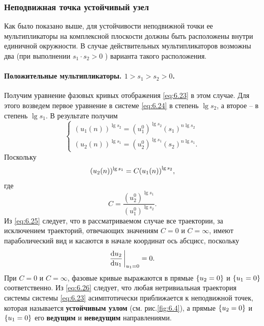 \subsubsection{Неподвижная точка устойчивый узел}%

Как было показано выше, для устойчивости неподвижной точки ее
мультипликаторы на комплексной плоскости должны быть расположены
внутри единичной окружности. В случае действительных мультипликаторов
возможны два (при выполнении $s_1 \cdot s_2>0$ ) варианта такого расположения.

\paragraph{Положительные мультипликаторы. $1>s_1>s_2>0$.}%

Получим уравнение фазовых кривых отображения \eqref{eq:6.23} в этом случае. 
Для этого возведем первое уравнение в системе \eqref{eq:6.24} в степень $\lg s_2$, а второе --
в степень $\lg s_1$. В результате получим
\begin{equation}
        \label{eq:6.25}
        \begin{cases}
                (u_1(n))^{\lg s_2} = (u_1^0)^{\lg s_2} (s_1)^{n \lg s_2} \\
                 (u_2(n))^{\lg s_1} = (u_2^0)^{\lg s_1} (s_2)^{n \lg s_1}.
        \end{cases}
\end{equation}
Поскольку
\begin{equation}
        \label{eq:6.26}
        ( u_2(n))^{\lg s_1} = C\qty( u_1(n) )^{\lg s_2},
\end{equation}
где
\begin{equation}
        \label{eq:}
        C = \frac{( u_2^0)^{\lg s_1}}{(u_1^0)^{\lg s_2}}.
\end{equation}
Из \eqref{eq:6.25} следует, что в рассматриваемом случае все траектории, за исключением траекторий, отвечающих значениям
$C=0$ и $C=\infty$, имеют параболический вид и касаются в начале координат ось абсцисс, поскольку
\begin{equation}
        \label{eq:}
        \dv{u_2}{u_1} \eval_{u_1=0} = 0.
\end{equation}
При $C=0$ и $C=\infty$, фазовые кривые выражаются в прямые 
$\qty{u_2=0}$ и $\qty{u_{1}=0}$ соответственно. Из
\eqref{eq:6.26} следует, что любая нетривиальная траектория системы 
системы  \eqref{eq:6.23} асимптотически приближается к неподвижной  точек, которая называется
\textbf{устойчивым узлом} (см. рис.\ref{fig:6.4}), а прямые $\qty{u_2=0}$ и $\qty{u_1=0}$
его \textbf{ведущим} и \textbf{неведущим} направлениями.

